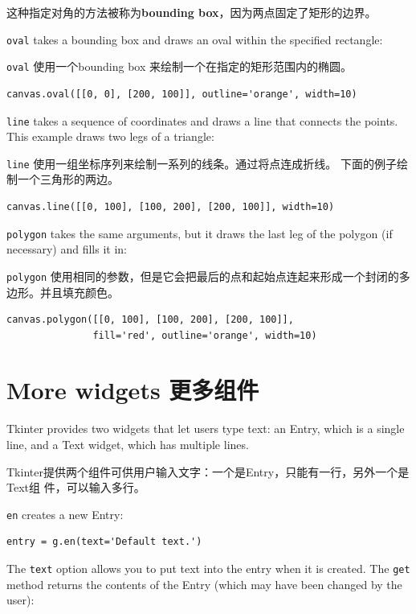 \documentclass[10pt]{book}
\begin{document}
\begin{CJK}{UTF8}{gbsn}
这种指定对角的方法被称为{\bf bounding box}，因为两点固定了矩形的边界。

{\tt oval} takes a bounding box and draws an oval
within the specified rectangle:

{\tt oval} 使用一个bounding box 来绘制一个在指定的矩形范围内的椭圆。

\begin{verbatim}
canvas.oval([[0, 0], [200, 100]], outline='orange', width=10)
\end{verbatim}
%
{\tt line} takes a sequence of coordinates and draws
a line that connects the points.  This example draws two legs
of a triangle:

{\tt line} 使用一组坐标序列来绘制一系列的线条。通过将点连成折线。
下面的例子绘制一个三角形的两边。

\begin{verbatim}
canvas.line([[0, 100], [100, 200], [200, 100]], width=10)
\end{verbatim}
%
{\tt polygon} takes the same arguments, but it draws the last
leg of the polygon (if necessary) and fills it in:

{\tt polygon} 使用相同的参数，但是它会把最后的点和起始点连起来形成一个封闭的多
边形。并且填充颜色。

\begin{verbatim}
canvas.polygon([[0, 100], [100, 200], [200, 100]],
               fill='red', outline='orange', width=10)
\end{verbatim}
%


\section{More widgets 更多组件}

Tkinter provides two widgets that let users type text: an
Entry, which is a single line, and a Text widget, which has
multiple lines.

Tkinter提供两个组件可供用户输入文字：一个是Entry，只能有一行，另外一个是Text组
件，可以输入多行。

{\tt en} creates a new Entry:

\begin{verbatim}
entry = g.en(text='Default text.')
\end{verbatim}
%
The {\tt text} option allows you to put text into the entry
when it is created.  The {\tt get} method returns the contents
of the Entry (which may have been changed by the user):


\end{CJK}
\end{document}
